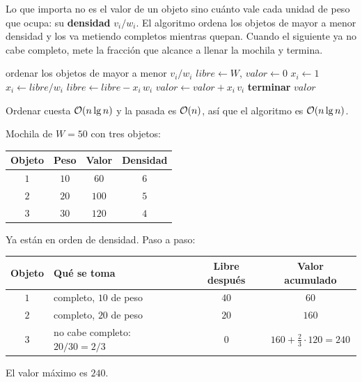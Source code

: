 \documentclass[11pt,letterpaper]{article}
\begin{document}
Lo que importa no es el valor de un objeto sino cuánto vale cada
unidad de peso que ocupa: su \textbf{densidad} $v_i / w_i$. El
algoritmo ordena los objetos de mayor a menor densidad y los va
metiendo completos mientras quepan. Cuando el siguiente ya no cabe
completo, mete la fracción que alcance a llenar la mochila y termina.

\begin{algorithm}[H]
\caption{\textsc{Mochila-Fraccional}$(w, v, W)$}
\begin{algorithmic}[1]
\State ordenar los objetos de mayor a menor $v_i / w_i$
\State $\mathit{libre} \gets W$, \quad $\mathit{valor} \gets 0$
    \State $x_i \gets 1$
  \Else
    \State $x_i \gets \mathit{libre} / w_i$
  \EndIf
  \State $\mathit{libre} \gets \mathit{libre} - x_i\, w_i$
  \State $\mathit{valor} \gets \mathit{valor} + x_i\, v_i$
    \State \textbf{terminar}
  \EndIf
\EndFor
\State \Return $\mathit{valor}$
\end{algorithmic}
\end{algorithm}

Ordenar cuesta $\mathcal{O}\!\left(n \lg n\right)$ y la pasada es $\mathcal{O}\!\left(n\right)$, así que el
algoritmo es $\mathcal{O}\!\left(n \lg n\right)$.

\begin{ejemplo}
  Mochila de $W = 50$ con tres objetos:
  \begin{center}
  \begin{tabular}{cccc}
    \toprule
    \textbf{Objeto} & \textbf{Peso} & \textbf{Valor}
      & \textbf{Densidad} \\
    \midrule
    $1$ & $10$ & $60$  & $6$ \\
    $2$ & $20$ & $100$ & $5$ \\
    $3$ & $30$ & $120$ & $4$ \\
    \bottomrule
  \end{tabular}
  \end{center}
  Ya están en orden de densidad. Paso a paso:
  \begin{center}
  \begin{tabular}{clcc}
    \toprule
    \textbf{Objeto} & \textbf{Qué se toma} & \textbf{Libre después}
      & \textbf{Valor acumulado} \\
    \midrule
    $1$ & completo, $10$ de peso & $40$ & $60$ \\
    $2$ & completo, $20$ de peso & $20$ & $160$ \\
    $3$ & no cabe completo: $20/30 = 2/3$ & $0$
        & $160 + \tfrac{2}{3} \cdot 120 = 240$ \\
    \bottomrule
  \end{tabular}
  \end{center}
  El valor máximo es $240$.
\end{ejemplo}
\end{document}

